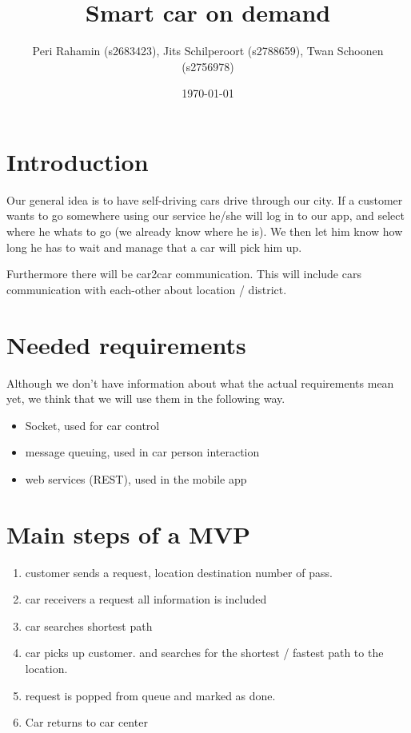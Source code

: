 \documentclass[8pt]{article}
\title{Smart car on demand}
\author{Peri Rahamin (s2683423),
  Jits Schilperoort (s2788659),
  Twan Schoonen (s2756978)}
\date{\today}
\begin{document}
\maketitle

\section{Introduction}

Our general idea is to have self-driving cars drive through our city.
If a customer wants to go somewhere using our service he/she will log in to our app, and select where he whats to go (we already know where he is).
We then let him know how long he has to wait and manage that a car will pick him up.

Furthermore there will be car2car communication. This will include cars communication with each-other about location / district.

\section{Needed requirements}
Although we don't have information about what the actual requirements mean yet, we think that we will use them in the following way.
\begin{itemize}[nolistsep]
\item Socket, used for car control
\item message queuing, used in car \- person interaction
\item web services (REST), used in the mobile app
\end{itemize}

\section{Main steps of a MVP}

\begin{enumerate}[nolistsep]
\item customer sends a request, location destination number of pass.
  
\item car receivers a request all information is included
  
\item car searches shortest path

\item car picks up customer. and searches for the shortest / fastest path to the location.

\item request is popped from queue and marked as done.

\item Car returns to car center

\end{enumerate}
\end{document}
